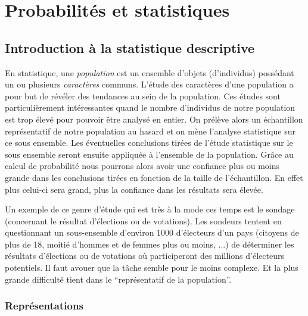\documentclass[a4paper,12pt]{book}
\begin{document}
\chapter{Probabilités et statistiques}

\section{Introduction à la statistique descriptive}

En statistique, une \textit{population} est un ensemble d'objets (d'individus) possédant un ou plusieurs \textit{caractères} communs.
L'étude des caractères d'une population a pour but de révéler des tendances au sein de la population. Ces études sont particulièrement
intéressantes quand le nombre d'individus de notre population est trop élevé pour pouvoir être analysé en entier. On prélève alors un échantillon 
représentatif de notre population au hasard 
et on mène l'analyse statistique sur ce sous ensemble. Les éventuelles conclusions tirées de l'étude statistique sur le sous ensemble seront ensuite appliquée
à l'ensemble de la population. Grâce au calcul de probabilité nous pourrons alors avoir une confiance plus ou moins grande dans les conclusions 
tirées en fonction de la taille de l'échantillon. En effet plus celui-ci sera grand, plus la confiance dans les résultats sera élevée.

Un exemple de ce genre d'étude qui est très à la mode ces temps est le sondage (concernant le résultat d'élections ou de votations). 
Les sondeurs tentent en questionnant un sous-ensemble 
d'environ 1000 d'électeurs d'un pays (citoyens de plus de 18, moitié d'hommes et de femmes plus ou moins, ...) de déterminer 
les résultats d'élections ou de votations où participeront des millions d'électeurs potentiels. Il faut avouer que la tâche semble pour 
le moins complexe. Et la plus grande difficulté tient dans le ``représentatif de la population''.

\subsection{Représentations}
\end{document}
